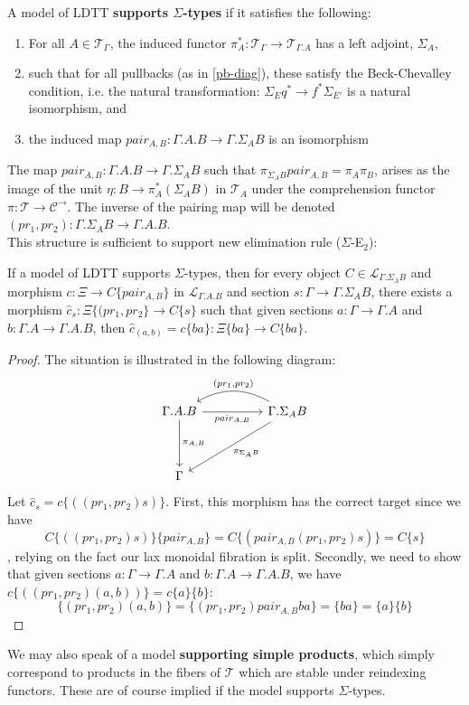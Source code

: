 \begin{defn}A model of LDTT \textbf{supports $\Sigma$-types} if it satisfies the following:
  \begin{enumerate}
  \item For all $A \in \mathcal{T}_{\Gamma}$, the induced functor $\pi_A^* : \mathcal{T}_{\Gamma} \to \mathcal{T}_{\Gamma.A}$ has a left adjoint, $\Sigma_A$,
  \item such that for all pullbacks (as in \ref{pb-diag}), these satisfy the Beck-Chevalley condition, i.e. the natural transformation: $\Sigma_Eq^* \to f^*\Sigma_{E'}$ is a natural isomorphism, and
  \item the induced map $pair_{A,B} : \Gamma.A.B \to \Gamma.\Sigma_AB$ is an isomorphism
  \end{enumerate}
\end{defn}
The map $pair_{A, B} : \Gamma.A.B \to \Gamma.\Sigma_AB$ such that $\pi_{\Sigma_AB}pair_{A,B} = \pi_A\pi_B$, arises as the image of the unit $\eta : B \to \pi_A^*(\Sigma_AB)$ in $\mathcal{T}_A$ under the comprehension functor $\pi : \mathcal{T} \to \mathcal{C}^{\to}$. The inverse of the pairing map will be denoted $(pr_1, pr_2) : \Gamma.\Sigma_AB \to \Gamma.A.B$.\\
This structure is sufficient to support new elimination rule ($\Sigma$-E$_2$):
\begin{thm}
If a model of LDTT supports $\Sigma$-types, then for every object $C \in \mathcal{L}_{\Gamma.\Sigma_AB}$ and morphism $c : \Xi \to C\{pair_{A,B}\}$ in $\mathcal{L}_{\Gamma.A.B}$ and section $s : \Gamma \to \Gamma.\Sigma_AB$, there exists a morphism $\hat c_s : \Xi\{(pr_1, pr_2\} \to C\{s\}$ such that given sections $a : \Gamma \to \Gamma.A$ and $b : \Gamma.A \to \Gamma.A.B$, then $\hat c_{(a, b)} = c\{ba\} : \Xi\{ba\} \to C\{ba\}$.
\begin{proof}
  The situation is illustrated in the following diagram:
    \[
      \ti
      \Gamma.A.B \ar[d, "\pi_{A,B}"] \ar[r,"pair_{A,B}",swap] & \Gamma.\Sigma_AB \ar[l,"{(pr_1, pr_2)}",bend right,swap] \ar[dl, "\pi_{\Sigma_AB}"]\\
      \Gamma &
      \kz
    \]
Let $\hat c_s = c\{((pr_1, pr_2)s)\}$. First, this morphism has the correct target since we have
    \[
      C\{((pr_1,pr_2)s)\}\{pair_{A,B}\} = C\{(pair_{A,B}(pr_1,pr_2)s)\} = C\{s\}
    \]
    , relying on the fact our lax monoidal fibration is split. Secondly, we need to show that given sections $a : \Gamma \to \Gamma.A$ and $b : \Gamma.A \to \Gamma.A.B$, we have $c\{((pr_1,pr_2)(a, b))\} = c\{a\}\{b\}$:
    \[
      \{(pr_1,pr_2)(a, b)\} = \{(pr_1,pr_2)pair_{A,B}ba\} = \{ba\} = \{a\}\{b\}
    \]
  \end{proof}
\end{thm}
We may also speak of a model \textbf{supporting simple products}, which simply correspond to products in the fibers of $\mathcal{T}$ which are stable under reindexing functors. These are of course implied if the model supports $\Sigma$-types.\\
